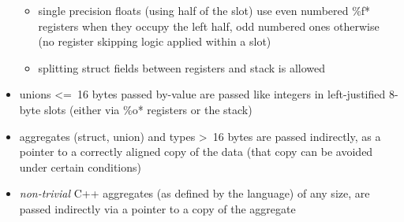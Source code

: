 \begin{itemize}
\begin{itemize}
\item single precision floats (using half of the slot) use even numbered \%f* registers when they occupy the left half, odd numbered ones otherwise (no register skipping logic applied within a slot)
\item splitting struct fields between registers and stack is allowed
\end{itemize}
\item unions \textless=\ 16 bytes passed by-value are passed like integers in left-justified 8-byte slots (either via \%o* registers or the stack)
\item aggregates (struct, union) and types \textgreater\ 16 bytes are passed indirectly, as a pointer to a correctly aligned copy of the data (that copy can be avoided under certain conditions)
\item {\it non-trivial} C++ aggregates (as defined by the language) of any size, are passed indirectly via a pointer to a copy of the aggregate
\end{itemize}

